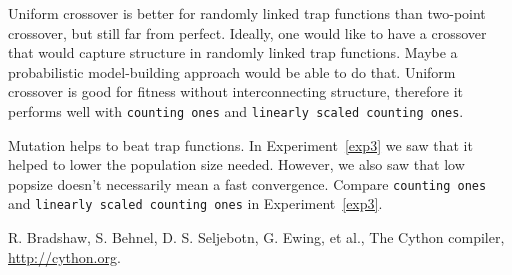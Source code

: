 \documentclass[12pt]{article}
\theoremstyle{definition}
\newcommand{\co}{\texttt{counting ones}}
\newcommand{\lsco}{\texttt{linearly scaled counting ones}}
\begin{document}
Uniform crossover is better for randomly linked trap functions than two-point crossover,
but still far from perfect.
Ideally, one would like to have a crossover that would capture structure in randomly linked
trap functions.
Maybe a probabilistic model-building approach would be able to do that.
Uniform crossover is good for fitness without interconnecting structure,
therefore it performs well with \co{} and \lsco{}.

Mutation helps to beat trap functions.
In Experiment~\ref{exp3} we saw that it helped to lower the population size needed.
However, we also saw that low popsize doesn't necessarily mean a fast convergence.
Compare \co{} and \lsco{} in Experiment~\ref{exp3}.

\begin{thebibliography}{9}

R. Bradshaw, S. Behnel, D. S. Seljebotn, G. Ewing, et al.,
The Cython compiler, \url{http://cython.org}.

\end{thebibliography}
\end{document}
